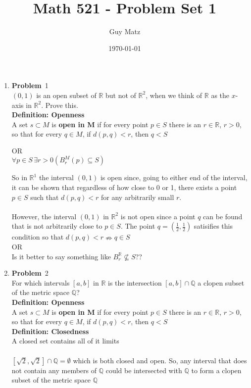 \documentclass[12pt]{amsart}
\title{\textbf{Math 521 - Problem Set 1}}
\author{Guy Matz}
\date{\today}
\theoremstyle{definition}
\newcommand{\mbR}{\mathbb{R}}
\newcommand{\mbQ}{\mathbb{Q}}
\newcommand{\itep}{\item {\bfseries Problem}\ }
\begin{document}
 


\begin{enumerate}[series=p]
\itep 1 \\
$(0, 1)$ is an open subset of $\mbR$ but not of $\mbR^2$, when we think of $\mbR$ as the $x$-axis in $\mbR^2$.  Prove this.
\\

\textbf{Definition: Openness}\\
	A set $s \subset M$ is \textbf{open in M} if for every point $p \in S$ there is an $r \in \mbR$, $r>0$, so that for every $q \in M$,
	if $d(p,q) < r$, then $q < S$
	\begin{center}
		OR
		\\
		$\forall p \in S \, \exists r > 0 (B_r^M(p) \subseteq S)$
	\end{center}
So in $\mbR^1$ the interval $(0,1)$ is open since, going to either end of the interval, it can be shown that regardless of how close to 0 or 1, there exists a point $p \in S$ such that $d(p,q) < r$ for any arbitrarily small $r$.
\\
\\
However, the interval $(0,1)$ in $\mbR^2$ is not open since a point $q$ can be found that is not arbitrarily close to $p \in S$.  The point $q = (\frac{1}{2}, \frac{1}{2})$ satisifies this condition so that $d(p,q) < r \nRightarrow q \in S$
\\
OR
\\
Is it better to say something like $B_r^\mbR \nsubseteq S$??

\newpage

\itep 2 \\
For which intervals $[a,b]$ in $\mbR$ is the intersection $[a,b] \cap \mbQ$ a clopen subset of the metric space $\mbQ$?
\\
\textbf{Definition: Openness}\\
A set $s \subset M$ is \textbf{open in M} if for every point $p \in S$ there is an $r \in \mbR$, $r>0$, so that for every $q \in M$,
if $d(p,q) < r$, then $q < S$
\\
\textbf{Definition: Closedness}\\
A closed set contains all of it limits\\
\\
$[\sqrt{2}, \sqrt{2}] \cap \mbQ = \emptyset$ which is both closed and open.  So, any interval that does not contain any members of $\mbQ$ could be intersected with $\mbQ$ to form a clopen subset of the metric space $\mbQ$
\newpage


\end{enumerate}
\end{document}
